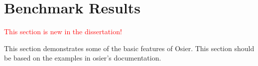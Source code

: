 % 


\chapter{Benchmark Results}


\textcolor{red}{This section is new in the dissertation!}

This section demonstrates some of the basic features of Osier. This section
should be based on the examples in \ac{osier}'s documentation.









